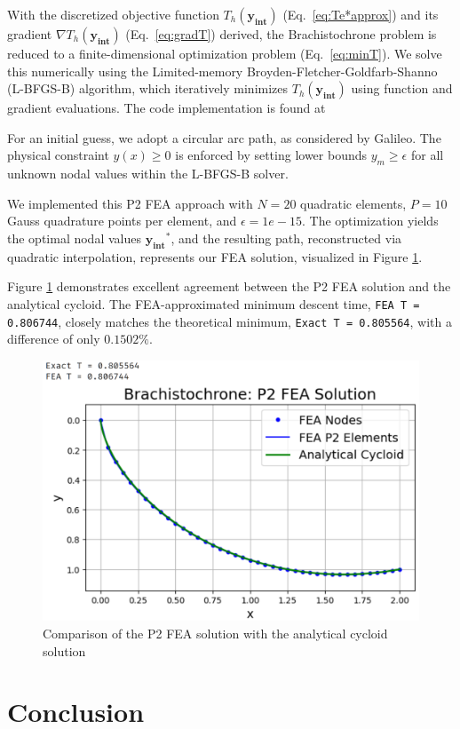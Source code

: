 \documentclass[11pt]{article}
\begin{document}
With the discretized objective function \( T_h(\mathbf{y_\text{int}}) \) (Eq.~\eqref{eq:Te*approx}) and its gradient \( \nabla T_h(\mathbf{y_\text{int}}) \) (Eq.~\eqref{eq:gradT}) derived, the Brachistochrone problem is reduced to a finite-dimensional optimization problem (Eq.~\eqref{eq:minT}). We solve this numerically using the Limited-memory Broyden-Fletcher-Goldfarb-Shanno (L-BFGS-B) algorithm, which iteratively minimizes \( T_h(\mathbf{y_\text{int}}) \) using function and gradient evaluations. The code implementation is found at 

For an initial guess, we adopt a circular arc path, as considered by Galileo.  The physical constraint \(y(x) \ge 0\) is enforced by setting lower bounds \( y_m \ge \epsilon \) for all unknown nodal values within the L-BFGS-B solver.

We implemented this P2 FEA approach with $ N = 20 $ quadratic elements, $ P = 10 $ Gauss quadrature points per element, and $ \epsilon = 1e-15 $.  The optimization yields the optimal nodal values $ \mathbf{y_\text{int}}^{*} $, and the resulting path, reconstructed via quadratic interpolation, represents our FEA solution, visualized in Figure \ref{fig:1}.

Figure \ref{fig:1} demonstrates excellent agreement between the P2 FEA solution and the analytical cycloid. The FEA-approximated minimum descent time, \texttt{FEA T = 0.806744}, closely matches the theoretical minimum, \texttt{Exact T = 0.805564}, with a difference of only \(0.1502\%\).
\begin{figure}
    \centering
    \includegraphics[width=0.6\linewidth]{FEA_plot.png}
    \caption{Comparison of the P2 FEA solution with the analytical cycloid solution}
    \label{fig:1}
\end{figure}


\section{Conclusion}
\end{document}
